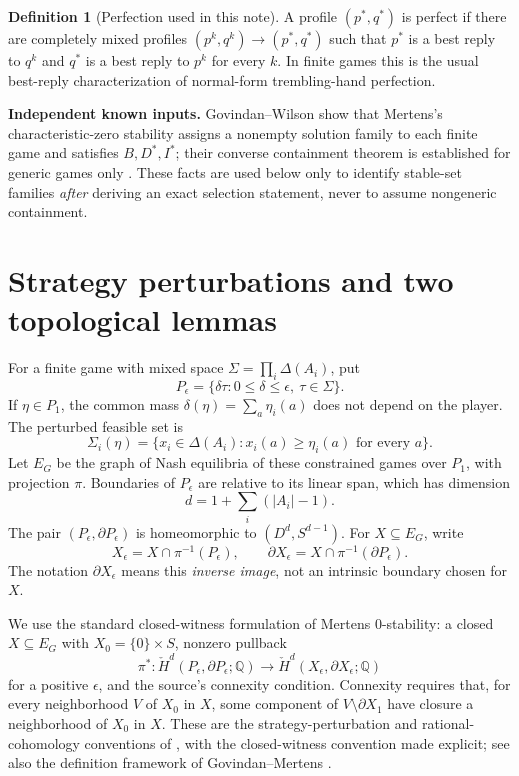 \documentclass[11pt]{article}
\newcommand{\Q}{\mathbb Q}
\theoremstyle{definition}
\newtheorem{definition}[theorem]{Definition}
\theoremstyle{remark}
\begin{document}
\begin{definition}[Perfection used in this note]
A profile $(p^*,q^*)$ is perfect if there are completely mixed profiles
$(p^k,q^k)\to(p^*,q^*)$ such that $p^*$ is a best reply to $q^k$ and $q^*$ is a
best reply to $p^k$ for every $k$. In finite games this is the usual
best-reply characterization of normal-form trembling-hand perfection.
\end{definition}


\noindent\textbf{Independent known inputs.} Govindan--Wilson show that
Mertens's characteristic-zero stability assigns a nonempty solution
family to each finite game and satisfies $B,D^*,I^*$; their converse
containment theorem is established for generic games only
\cite[Theorem 6.1 and Appendices A--B]{gw}. These facts are used below
only to identify stable-set families \emph{after} deriving an exact
selection statement, never to assume nongeneric containment.

\section{Strategy perturbations and two topological lemmas}
For a finite game with mixed space $\Sigma=\prod_i\Delta(A_i)$, put
\[
 P_\epsilon=\{\delta\tau:0\le\delta\le\epsilon,\ \tau\in\Sigma\}.
\]
If $\eta\in P_1$, the common mass $\delta(\eta)=\sum_a\eta_i(a)$ does not depend
on the player. The perturbed feasible set is
\[
 \Sigma_i(\eta)=\{x_i\in\Delta(A_i):x_i(a)\ge\eta_i(a)\text{ for every }a\}.
\]
Let $E_G$ be the graph of Nash equilibria of these constrained games over
$P_1$, with projection $\pi$. Boundaries of $P_\epsilon$ are relative to its
linear span, which has dimension
\[
 d=1+\sum_i(|A_i|-1).
\]
The pair $(P_\epsilon,\partial P_\epsilon)$ is homeomorphic to
$(D^d,S^{d-1})$. For $X\subseteq E_G$, write
\[
 X_\epsilon=X\cap\pi^{-1}(P_\epsilon),\qquad
 \partial X_\epsilon=X\cap\pi^{-1}(\partial P_\epsilon).
\]
The notation $\partial X_\epsilon$ means this \emph{inverse image}, not an
intrinsic boundary chosen for $X$.

We use the standard closed-witness formulation of Mertens $0$-stability:
a closed $X\subseteq E_G$ with $X_0=\{0\}\times S$, nonzero pullback
\[
 \pi^*:\check H^d(P_\epsilon,\partial P_\epsilon;\Q)
       \longrightarrow\check H^d(X_\epsilon,\partial X_\epsilon;\Q)
\]
for a positive $\epsilon$, and the source's connexity condition. Connexity
requires that, for every neighborhood $V$ of $X_0$ in $X$, some component of
$V\setminus\partial X_1$ have closure a neighborhood of $X_0$ in $X$.
These are the strategy-perturbation and rational-cohomology conventions of
\cite[Definition 2.4]{gw}, with the closed-witness convention made explicit;
see also the definition framework of Govindan--Mertens \cite{gm}.
\end{document}
